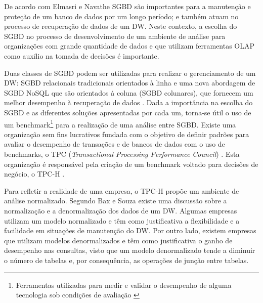 De acordo com Elmasri e Navathe \cite{navathe2011banco} SGBD são importantes para a manutenção 
e proteção de um banco de dados por um longo período; e também atuam no processo de recuperação de dados de um DW. Neste contexto, 
a escolha do SGBD no processo de desenvolvimento de um ambiente de análise para organizações com grande quantidade de dados e que utilizam ferramentas OLAP 
como auxílio na tomada de decisões é importante. 

Duas classes de SGBD podem ser utilizadas para realizar o gerenciamento de um DW: SGBD relacionais tradicionais orientados à linha e uma nova abordagem de SGBD 
NoSQL que são orientados à coluna (SGBD colunares), que fornecem um melhor desempenho à recuperação de dados \cite{good2017column}. 
Dada a importância na escolha do SGBD e as diferentes soluções apresentadas por cada um, torna-se útil o uso de um 
benchmark\footnote{Ferramentas utilizadas para medir e validar o desempenho de alguma tecnologia sob condições de avaliação \cite{bouckaert2010benchmarking}} 
para a realização de uma análise entre SGBD. Existe uma organização sem fins lucrativos fundada com o objetivo de definir padrões para avaliar o 
desempenho de transações e de bancos de dados com o uso de benchmarks, o TPC (\textit{Transactional Processing Performance Council}) \cite{tpc2017page}. 
Esta organização é responsável pela criação de um benchmark voltado para decisões de negócio, o TPC-H \cite{tpch2017page}.

Para refletir a realidade de uma empresa, o TPC-H propõe um ambiente de análise normalizado. Segundo Bax e Souza \cite{bax2003modelagem} 
existe uma discussão sobre a normalização e a denormalização dos dados de um DW. Algumas empresas utilizam um modelo normalizado e têm como 
justificativa a flexibilidade e a facilidade em situações de manutenção do DW. Por outro lado, existem empresas que utilizam modelos denormalizados 
e têm como justificativa o ganho de desempenho nas consultas, visto que um modelo denormalizado tende a diminuir o número de tabelas e, por consequência, 
as operações de junção entre tabelas. 

